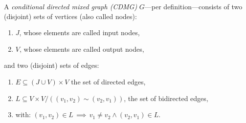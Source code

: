 \begin{Def}
    \label{def-cdmg}
    A \emph{conditional directed mixed graph (CDMG)} $G$---per definition---consists of two (disjoint) sets of
    vertices (also called nodes):
    \begin{enumerate}[label=\roman*.)]
        \item $J$, whose elements are called input nodes,
        \item $V$, whose elements are called output nodes,
    \end{enumerate}
    and two (disjoint) sets of edges:
    \begin{enumerate}[resume,label=\roman*.)]
        \item $E \subseteq (J \cup V) \times V$ the set of directed edges,
        \item $L \subseteq V \times V/((v_1,v_2) \sim (v_2,v_1)) $, the set of bidirected edges,
        \item[]    with: $(v_1,v_2) \in L \,\implies\, v_1\neq v_2 \land (v_2,v_1) \in L$.
    \end{enumerate}
\end{Def}
